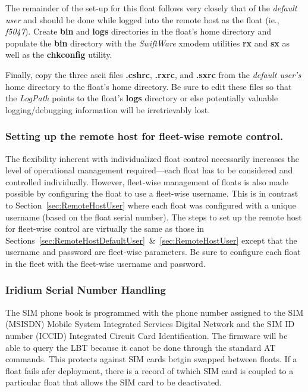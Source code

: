 The remainder of the set-up for this float follows very closely that of the
\emph{default user}\/ and should be done while logged into the remote host
as the float (ie., \emph{f5047}\/).  Create \textbf{bin} and \textbf{logs}
directories in the float's home directory and populate the \textbf{bin}
directory with the \emph{SwiftWare}\/ xmodem utilities \textbf{rx} and
\textbf{sx} as well as the \textbf{chkconfig} utility.

Finally, copy the three ascii files \textbf{.cshrc}, \textbf{.rxrc}, and
\textbf{.sxrc} from the \emph{default user's}\/ home directory to the
float's home directory.  Be sure to edit these files so that the {\sl
  LogPath}\/ points to the float's \textbf{logs} directory or else
potentially valuable logging/debugging information will be irretrievably
lost.

\subsubsection{Setting up the remote host for fleet-wise remote control.} 
\label{sec:RemoteHostFleet} 

The flexibility inherent with individualized float control necessarily
increases the level of operational management required---each float has to
be considered and controlled individually.  However, fleet-wise management
of floats is also made possible by configuring the float to use a fleet-wise
username.  This is in contrast to Section~\ref{sec:RemoteHostUser} where
each float was configured with a unique username (based on the float serial
number).  The steps to set up the remote host for fleet-wise control are
virtually the same as those in
Sections~\ref{sec:RemoteHostDefaultUser}~\&~\ref{sec:RemoteHostUser} except
that the username and password are fleet-wise parameters.  Be sure to
configure each float in the fleet with the fleet-wise username and password.


\subsubsection{Iridium Serial Number Handling} 

The SIM phone book is programmed with the phone number assigned to the SIM (MSISDN)
Mobile System Integrated Services Digital Network and the SIM ID number (ICCID)
Integrated Circuit Card Identification.  The firmware will be able to query the
LBT because it canot be done through the standard AT commands.  This protects
against SIM cards betgin swapped between floats.  If a float fails afer deployment,
there is a record of twhich SIM card is coupled to a particular float that allows
the SIM card to be deactivated.

